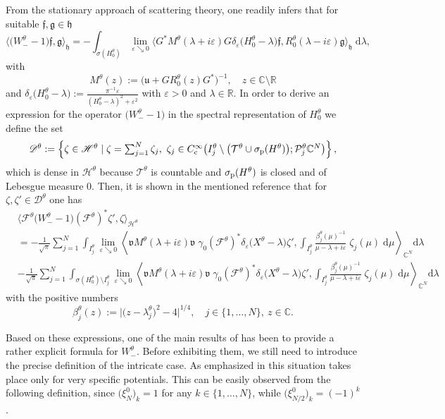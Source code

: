 \documentclass[11pt]{article}
\def\C{\mathbb C}
\def\d{\mathrm d}
\def\Drond{\mathscr D}
\def\f{\mathfrak f}
\def\F{\mathscr F}
\def\g{\mathfrak g}
\def\Hrond{\mathscr H}
\def\h{\mathfrak h}
\def\P{\mathcal P}
\def\R{\mathbb R}
\def\T{\mathcal T}
\def\u{\mathfrak u}
\def\v{\mathfrak v}
\begin{document}
From the stationary approach of scattering theory, one readily infers that 
for suitable $\f,\g\in \h$
$$
\big\langle\big(W_-^\theta-1\big)\f,\g\big\rangle_\h
=-\int_{\sigma(H_0^\theta)}\lim_{\varepsilon\searrow0}\big\langle G^*
M^\theta(\lambda+i\varepsilon)G\delta_\varepsilon\big(H_0^\theta-\lambda\big)\f,
R_0^\theta(\lambda-i\varepsilon)\g\big\rangle_\h\;\!\d\lambda,
$$
with
$$
M^\theta(z):=\big(\u+GR_0^\theta(z)G^*\big)^{-1},\quad z\in\C\setminus\R
$$
and
$
\delta_\varepsilon\big(H_0^\theta-\lambda\big)
:=\frac{\pi^{-1}\varepsilon}{(H_0^\theta-\lambda)^2+\varepsilon^2}
$
with $\varepsilon>0$ and $\lambda\in\R$.
In order to derive an expression for the operator
$\big(W_-^\theta-1\big)$ in the spectral representation of $H_0^\theta$ we define the set
$$
\textstyle\Drond^\theta
:=\left\{\zeta\in\Hrond^\theta\mid\zeta=\sum_{j=1}^N\zeta_j,
~\zeta_j\in C^\infty_{\rm c}\big(I^\theta_j\setminus
\big(\T^\theta\cup\sigma_{\rm p}(H^\theta)\big);\P^\theta_j\C^N\big)\right\},
$$
which is dense in $\Hrond^\theta$ because $\T^\theta$ is countable and
$\sigma_{\rm p}(H^\theta)$ is closed and of Lebesgue measure $0$. 
Then, it is shown in the mentioned reference that for  
$\zeta,\zeta'\in\Drond^\theta$ one has
\begin{align}
&\big\langle\F^\theta\big(W_-^\theta-1\big)(\F^{\theta })^*\zeta',
\zeta\big\rangle_{\Hrond^\theta}\nonumber\\
%
&=-\frac{1}{\sqrt{\pi}}\sum_{j=1}^N\int_{I^\theta_j}\lim_{\varepsilon\searrow0}
\left\langle\v M^\theta(\lambda+i\varepsilon)\v\;\!\gamma_0(\F^{\theta})^*
\delta_\varepsilon\big(X^\theta-\lambda\big)\zeta',
\int_{I_j^\theta}\frac{\beta_j^\theta(\mu)^{-1}}{\mu-\lambda+i\varepsilon}\;\!
\zeta_j(\mu)\;\!\d\mu\right\rangle_{\C^N}\d\lambda\label{eq_leading}\\
%
&-\frac{1}{\sqrt{\pi}}\sum_{j=1}^N\int_{\sigma(H^\theta_0)\setminus I^\theta_j}
\lim_{\varepsilon\searrow0}\left\langle\v M^\theta(\lambda+i\varepsilon)\v\;\!\gamma_0
(\F^{\theta})^*\delta_\varepsilon\big(X^\theta-\lambda\big)\zeta',
\int_{I_j^\theta}\frac{\beta_j^\theta(\mu)^{-1}}{\mu-\lambda+i\varepsilon}\;\!
\zeta_j(\mu)\;\!\d\mu\right\rangle_{\C^N}\d\lambda \label{eq_remainder}
\end{align}
with the positive numbers
$$
\beta_j^\theta(z):=\big|\big(z-\lambda_j^\theta\big)^2-4\big|^{1/4},
\quad j\in\{1,\dots,N\},~z\in\C.
$$

Based on these expressions, one of the main results of \cite{NRT} has been to provide
a rather explicit formula for $W_-^\theta$. Before exhibiting them,
we still need to introduce the precise definition of the intricate case.
As emphasized in \cite[Eq.~1.16]{NRT} this situation takes place only for very specific potentials.
This can be easily observed from the following definition, since $\big(\xi^0_{N}\big)_k=1$ for any $k\in \{1, \dots,N\}$,
while $\big(\xi^0_{N/2}\big)_k=(-1)^k$.
\end{document}

